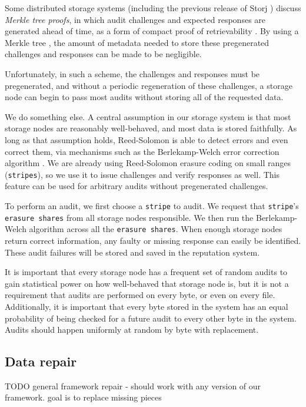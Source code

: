 \documentclass[a4paper,10pt]{article} \usepackage[utf8]{inputenc}
\newcommand{\x}[1]{{\tt #1}} \newcommand{\code}[1]{{\tt #1}}
\newcommand{\todo}[1]{{\color{red} TODO #1 }}
\begin{document}
Some distributed storage systems (including the previous release of Storj
\cite{storj-v2}) discuss {\em Merkle tree proofs}, in which audit challenges
and expected responses are generated ahead of time, as a form of compact
proof of retrievability \cite{proof-of-retrievability}. By using a Merkle tree
\cite{merkle-tree}, the amount of metadata needed to store these pregenerated
challenges and responses can be made to be negligible.

Unfortunately, in such a scheme, the challenges and responses must be
pregenerated, and without a periodic regeneration of these challenges, a
storage node can begin to pass most audits without storing all of the requested
data.

We do something else.
A central assumption in our storage system is that most storage nodes are
reasonably well-behaved, and most data is stored faithfully. As long as that
assumption holds, Reed-Solomon is able to detect errors and even correct them,
via mechanisms such as the Berlekamp-Welch error correction algorithm \cite{bw}.
We are already using Reed-Solomon erasure coding
\cite{rs} on small ranges (\x{stripes}), so we use it to issue challenges and
verify responses as well.
This feature can be used for arbitrary audits without pregenerated challenges.

To perform an audit, we first choose a \x{stripe} to audit. We request that
\x{stripe}'s \x{erasure shares} from all storage nodes responsible. We then run
the Berlekamp-Welch algorithm \cite{bw} across all the \x{erasure shares}. When
enough storage nodes return correct information, any faulty or missing response
can easily be identified. These audit failures will be stored and saved in the
reputation system.

It is important that every storage node has a frequent set of random audits to
gain statistical power on how well-behaved that storage node is, but it is not
a requirement that audits are performed on every byte, or even on every file.
Additionally, it is important that every byte stored in the system has an equal
probability of being checked for a future audit to every other byte in the
system. Audits should happen uniformly at random by byte with replacement.

\subsection{Data repair}

\todo{general framework repair - should work with any version of our framework.
goal is to replace missing pieces}
\end{document}

